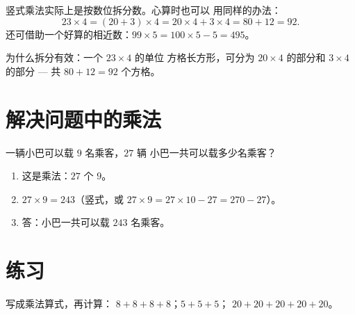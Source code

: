 \begin{example}[拆分后心算]\label{ex:g3:mult:split}
竖式乘法实际上是按数位拆分数。心算时也可以
用同样的办法：
\[
23 \times 4 = (20 + 3) \times 4 = 20 \times 4 + 3 \times 4
= 80 + 12 = 92 .
\]
还可借助一个好算的相近数：$99 \times 5 = 100 \times 5 - 5 =
495$。
\end{example}

\begin{omfigure}

{\small 为什么拆分有效：一个 $23 \times 4$ 的单位
方格长方形，可分为 $20 \times 4$ 的部分和 $3 \times 4$ 的部分 ---
共 $80 + 12 = 92$ 个方格。}
\end{omfigure}

\section{解决问题中的乘法}

\begin{example}\label{ex:g3:mult:problem}
一辆小巴可以载 $9$ 名乘客，$27$ 辆
小巴一共可以载多少名乘客？
\begin{enumerate}
  \item 这是乘法：$27$ 个 $9$。
  \item $27 \times 9 = 243$（竖式，或
        $27 \times 9 = 27 \times 10 - 27 = 270 - 27$）。
  \item 答：小巴一共可以载 $243$ 名乘客。
\end{enumerate}
\end{example}

\section{练习}

\begin{exercise}[$\star$]\label{exo:g3:mult:1}
写成乘法算式，再计算：
$8 + 8 + 8 + 8$；\quad $5 + 5 + 5$；\quad
$20 + 20 + 20 + 20 + 20$。
\end{exercise}

